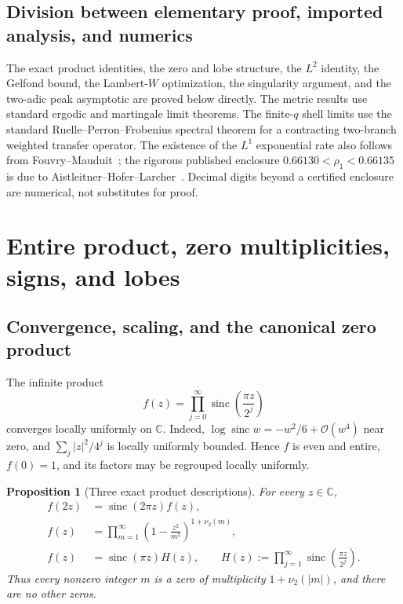 \documentclass[11pt,oneside]{article}
\newtheorem{proposition}[theorem]{Proposition}
\theoremstyle{definition}
\theoremstyle{remark}
\newcommand{\C}{\mathbb C}
\newcommand{\sinc}{\operatorname{sinc}}
\newcommand{\bigO}{\mathcal O}
\newcommand{\vtwo}{\nu_2}
\begin{document}
\subsection{Division between elementary proof, imported analysis, and numerics}

The exact product identities, the zero and lobe structure, the $L^2$ identity,
the Gelfond bound, the Lambert-$W$ optimization, the singularity argument, and
the two-adic peak asymptotic are proved below directly.  The metric results use
standard ergodic and martingale limit theorems.  The finite-$q$ shell limits use
the standard Ruelle--Perron--Frobenius spectral theorem for a contracting
two-branch weighted transfer operator.  The existence of the $L^1$ exponential
rate also follows from Fouvry--Mauduit~\cite{fouvrymauduit}; the rigorous
published enclosure $0.66130<\rho_1<0.66135$ is due to
Aistleitner--Hofer--Larcher~\cite{ahl2017}.  Decimal digits beyond a certified
enclosure are numerical, not substitutes for proof.

\section{Entire product, zero multiplicities, signs, and lobes}
\label{sec:product}

\subsection{Convergence, scaling, and the canonical zero product}

The infinite product
\begin{equation}
 f(z)=\prod_{j=0}^{\infty}\sinc\!\left(\frac{\pi z}{2^j}\right)
 \label{eq:f-def}
\end{equation}
converges locally uniformly on $\C$.  Indeed,
$\log\sinc w=-w^2/6+\bigO(w^4)$ near zero, and
$\sum_j|z|^2/4^j$ is locally uniformly bounded.  Hence $f$ is even and entire,
$f(0)=1$, and its factors may be regrouped locally uniformly.

\begin{proposition}[Three exact product descriptions]
\label{prop:products}
For every $z\in\C$,
\begin{align}
 f(2z)&=\sinc(2\pi z)f(z),
 \label{eq:dilation}\\
 f(z)&=\prod_{m=1}^{\infty}
 \left(1-\frac{z^2}{m^2}\right)^{1+\vtwo(m)},
 \label{eq:weierstrass}\\
 f(z)&=\sinc(\pi z)H(z),
 \qquad
 H(z):=\prod_{j=1}^{\infty}\sinc\!\left(\frac{\pi z}{2^j}\right).
 \label{eq:H-def}
\end{align}
Thus every nonzero integer $m$ is a zero of multiplicity $1+\vtwo(|m|)$,
and there are no other zeros.
\end{proposition}
\end{document}
